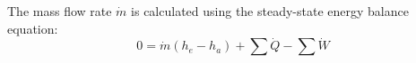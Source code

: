 The mass flow rate \( \dot{m} \) is calculated using the steady-state energy balance equation:  
\[ 0 = \dot{m} (h_e - h_a) + \sum \dot{Q} - \sum \dot{W} \]